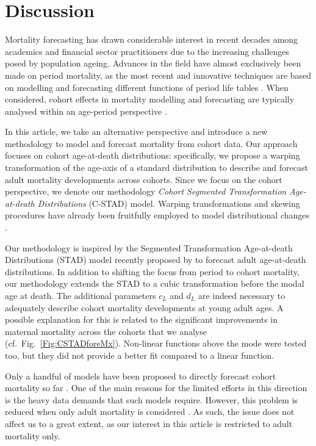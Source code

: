 \documentclass[11pt, a4paper]{article}
\begin{document}
\section{Discussion} 
\label{Sec:Discussion}
Mortality forecasting has drawn considerable interest in recent decades among academics and financial sector practitioners due to the increasing challenges posed by population ageing. Advances in the field have almost exclusively been made on period mortality, as the most recent and innovative techniques are based on modelling and forecasting different functions of period life tables \cite[see, for example,][]{lee1992modeling,cairns2006two,raftery2013bayesian}. When considered, cohort effects in mortality modelling and forecasting are typically analysed within an age-period perspective \citep{renshaw2006cohort,cairns2009quantitative,plat2009stochastic,dokumentov2018bivariate}.  
 
In this article, we take an alternative perspective and introduce a new methodology to model and forecast mortality from cohort data. Our approach focuses on cohort age-at-death distributions: specifically, we propose a warping transformation of the age-axis of a standard distribution to describe and forecast adult mortality developments across cohorts. Since we focus on the cohort perspective, we denote our methodology \emph{Cohort Segmented Transformation Age-at-death Distributions} (C-STAD) model. Warping transformations and skewing procedures have already been fruitfully employed to model distributional changes \cite[see, e.g.,][]{fernandez1998bayesian,camarda2008warped}. 

Our methodology is inspired by the Segmented Transformation Age-at-death Distributions (STAD) model recently proposed by \cite{basellini2019modelling} to forecast adult age-at-death distributions. In addition to shifting the focus from period to cohort mortality, our methodology extends the STAD to a cubic transformation before the modal age at death. The additional parameters $c_L$ and $d_L$ are indeed necessary to adequately describe cohort mortality developments at young adult ages. A possible explanation for this is related to the significant improvements in maternal mortality across the cohorts that we analyse (cf.~Fig.~\ref{Fig:CSTADforeMx}). Non-linear functions above the mode were tested too, but they did not provide a better fit compared to a linear function. 

Only a handful of models have been proposed to directly forecast cohort mortality so far \citep{chiou2009modeling,zanotto2017reconstruction,rizzi2019forecasting}. One of the main reasons for the limited efforts in this direction is the heavy data demands that such models require. However, this problem is reduced when only adult mortality is considered \citep{booth2006demographic}. As such, the issue does not affect us to a great extent, as our interest in this article is restricted to adult mortality only. 
\end{document}
